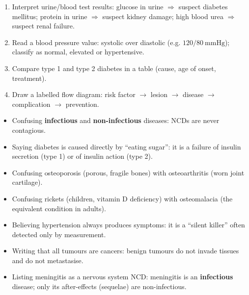 \documentclass[11pt]{article}
\newcommand{\cle}[1]{{\popxbold\color{popdark}#1}}
\begin{document}
\begin{methode}
\begin{enumerate}
\item Interpret urine/blood test results: glucose in urine $\Rightarrow$ suspect diabetes mellitus; protein in urine $\Rightarrow$ suspect kidney damage; high blood urea $\Rightarrow$ suspect renal failure.
\item Read a blood pressure value: systolic over diastolic (e.g. $120/80\ \mathrm{mmHg}$); classify as normal, elevated or hypertensive.
\item Compare type 1 and type 2 diabetes in a table (cause, age of onset, treatment).
\item Draw a labelled flow diagram: risk factor $\rightarrow$ lesion $\rightarrow$ disease $\rightarrow$ complication $\rightarrow$ prevention.
\end{enumerate}
\end{methode}

\begin{attention}
\begin{itemize}
\item Confusing \textbf{infectious} and \textbf{non-infectious} diseases: NCDs are never contagious.
\item Saying diabetes is caused directly by ``eating sugar'': it is a failure of insulin secretion (type 1) or of insulin action (type 2).
\item Confusing \cle{osteoporosis} (porous, fragile bones) with \cle{osteoarthritis} (worn joint cartilage).
\item Confusing \cle{rickets} (children, vitamin D deficiency) with \cle{osteomalacia} (the equivalent condition in adults).
\item Believing hypertension always produces symptoms: it is a ``silent killer'' often detected only by measurement.
\item Writing that all tumours are cancers: benign tumours do not invade tissues and do not metastasise.
\item Listing meningitis as a nervous system NCD: meningitis is an \textbf{infectious} disease; only its after-effects (sequelae) are non-infectious.
\end{itemize}
\end{attention}
\end{document}
